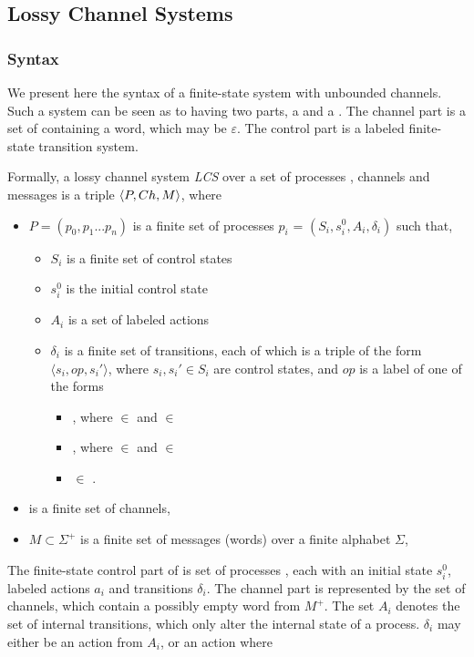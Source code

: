 \subsection{Lossy Channel Systems}
\subsubsection{Syntax}
We present here the syntax of a finite-state system with unbounded channels. Such a system can be seen as to having two parts, a  and a . The channel part is a set of  containing a word, which may be $\varepsilon$. The control part is a labeled finite-state transition system.

\label{CS}
Formally, a lossy channel system \emph{LCS} over a set of processes , channels  and messages  is a triple $\langle P,Ch,M\rangle$, where
\begin{itemize}
\item[] $P = (p_0,p_1...p_n)$ is a finite set of processes $p_i$ = $(S_i, s_i^0, A_i, \delta_i)$ such that,
  \begin{itemize}
    \item $S_i$ is a finite set of control states
    \item $s_i^0$ is the initial control state
    \item $A_i$ is a set of labeled actions 
    \item $\delta_i$ is a finite set of transitions, each of which is a triple of the form $\langle s_i,op,s_i'\rangle$, where $s_i, s_i'\in S_i$ are control states, and $op$ is a label of one of the forms
    \begin{itemize}
      \item {}, where  $\in$  and  $\in$ 
      \item {}, where  $\in$  and  $\in$ 
      \item {} $\in$ .
    \end{itemize}
\end{itemize}
\item[]  is a finite set of channels,
\item[] $M \subset \Sigma^+$ is a finite set of messages (words) over a finite alphabet $\Sigma$,
\end{itemize}

The finite-state control part of  is set of processes , each with an initial state $s_i^0$, labeled actions $a_i$ and transitions $\delta_i$. The channel part is represented by the set  of channels, which contain a possibly empty word from $M^+$. The set $A_i$ denotes the set of internal transitions, which only alter the internal state of a process. $\delta_i$ may either be an action from $A_i$, or an action where

